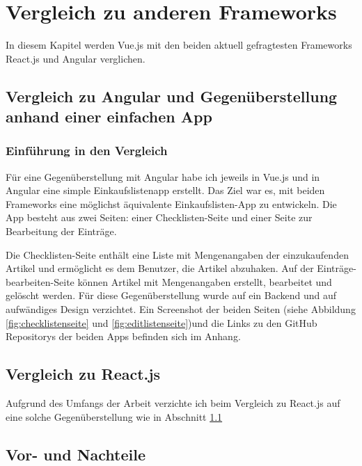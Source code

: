 
\chapter{Vergleich zu anderen Frameworks}
In diesem Kapitel werden Vue.js mit den beiden aktuell gefragtesten Frameworks React.js und Angular verglichen.

\section{Vergleich zu Angular und Gegenüberstellung anhand einer einfachen App}\label{sec:vergleich-zu-angular-und-gegenuberstellung-anhand-einer-einfachen-app}
\subsection*{Einführung in den Vergleich}
Für eine Gegenüberstellung mit Angular habe ich jeweils in Vue.js und in Angular eine
simple Einkaufslistenapp erstellt.
Das Ziel war es, mit beiden Frameworks eine möglichst äquivalente Einkaufslisten-App zu entwickeln.
Die App besteht aus zwei Seiten: einer Checklisten-Seite und einer Seite zur Bearbeitung der Einträge.

Die Checklisten-Seite enthält eine Liste mit Mengenangaben der einzukaufenden Artikel und ermöglicht es dem Benutzer, die Artikel abzuhaken.
Auf der Einträge-bearbeiten-Seite können Artikel mit Mengenangaben erstellt, bearbeitet und gelöscht werden.
Für diese Gegenüberstellung wurde auf ein Backend und auf aufwändiges Design verzichtet.
Ein Screenshot der beiden Seiten (siehe Abbildung \ref{fig:checklistenseite} und \ref{fig:editlistenseite})und die Links zu den GitHub Repositorys der beiden Apps befinden sich im Anhang.


\section{Vergleich zu React.js}
Aufgrund des Umfangs der Arbeit verzichte ich beim Vergleich zu React.js auf eine solche Gegenüberstellung wie in Abschnitt \ref{sec:vergleich-zu-angular-und-gegenuberstellung-anhand-einer-einfachen-app}

\section{Vor- und Nachteile}